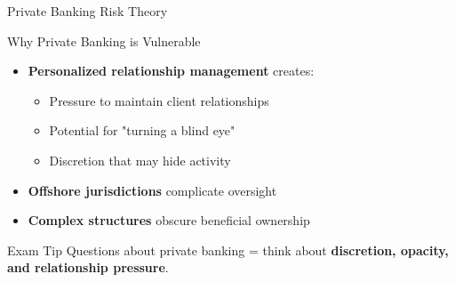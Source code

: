 \documentclass{beamer}
\begin{document}
\begin{frame}{Private Banking Risk Theory}
\begin{block}{Why Private Banking is Vulnerable}
\begin{itemize}
    \item \textbf{Personalized relationship management} creates:
    \begin{itemize}
        \item Pressure to maintain client relationships
        \item Potential for "turning a blind eye"
        \item Discretion that may hide activity
    \end{itemize}
    \item \textbf{Offshore jurisdictions} complicate oversight
    \item \textbf{Complex structures} obscure beneficial ownership
\end{itemize}
\end{block}

\begin{alertblock}{Exam Tip}
Questions about private banking = think about \textbf{discretion, opacity, and relationship pressure}.
\end{alertblock}
\end{frame}
\end{document}
